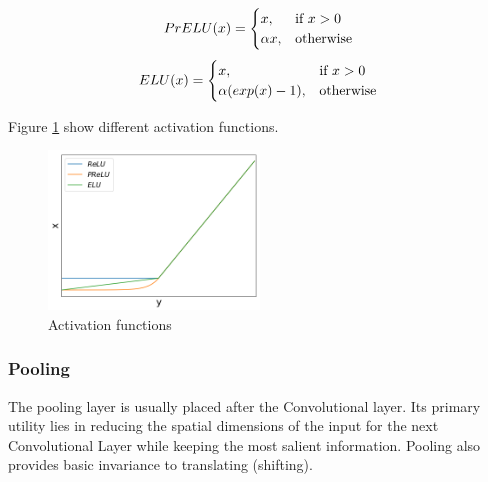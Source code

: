\documentclass[times, utf8, diplomski, numeric, english]{fer}
\begin{document}
\begin{equation}	
PrELU(x)=
\begin{cases}
x, & \text{if}\ x>0 \\
\alpha x, & \text{otherwise}
\end{cases}\\
\end{equation}
\begin{equation}
ELU(x)=
\begin{cases}
x, & \text{if}\ x>0 \\
\alpha (exp(x) - 1), & \text{otherwise}
\end{cases}	\\
\end{equation}

Figure \ref{fg:activations} show different activation functions.
\begin{figure}[!htb]
	\begin{center}
		\includegraphics[width=0.5\textwidth]{./imgs/activations.png}
		\caption{Activation functions}
		\label{fg:activations}
	\end{center}
\end{figure}



\subsubsection{Pooling}

The pooling layer is usually placed after the Convolutional layer. Its primary utility lies in reducing the spatial dimensions of the input for the next Convolutional Layer while keeping the most salient information.
Pooling also provides basic invariance to translating (shifting).
\end{document}

